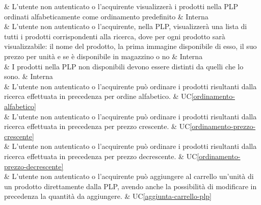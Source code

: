  & L'utente non autenticato o l'acquirente visualizzerà i prodotti nella PLP ordinati alfabeticamente come ordinamento predefinito & Interna \\

 & L'utente non autenticato o l'acquirente, nella PLP, visualizzerà una lista di tutti i prodotti corrispondenti alla ricerca, dove per ogni prodotto sarà visualizzabile: il nome del prodotto, la prima immagine disponibile di esso, il suo prezzo per unità e se è disponibile in magazzino o no & Interna \\

 & I prodotti nella PLP non disponibili devono essere distinti da quelli che lo sono. & Interna \\

 & L'utente non autenticato o l'acquirente può ordinare i prodotti risultanti dalla ricerca effettuata in precedenza per ordine alfabetico. & UC\ref{ordinamento-alfabetico} \\

 & L'utente non autenticato o l'acquirente può ordinare i prodotti risultanti dalla ricerca effettuata in precedenza per prezzo crescente. & UC\ref{ordinamento-prezzo-crescente} \\

 & L'utente non autenticato o l'acquirente può ordinare i prodotti risultanti dalla ricerca effettuata in precedenza per prezzo decrescente. & UC\ref{ordinamento-prezzo-decrescente} \\

 & L'utente non autenticato o l'acquirente può aggiungere al carrello un'unità di un prodotto direttamente dalla PLP, avendo anche la possibilità di modificare in precedenza la quantità da aggiungere. & UC\ref{aggiunta-carrello-plp} \\

